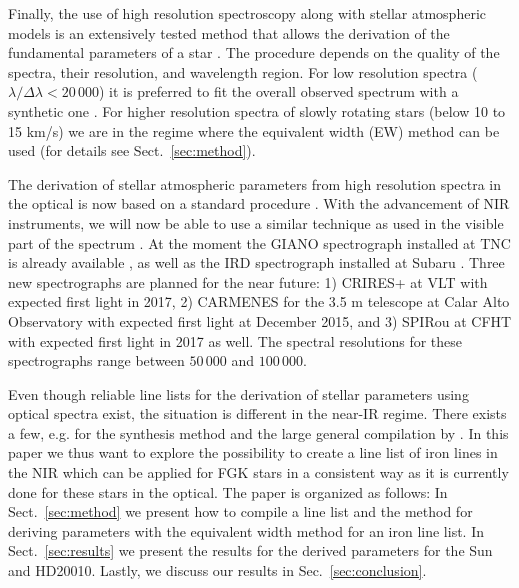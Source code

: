\documentclass{aa}
\begin{document}
Finally, the use of high resolution spectroscopy along with stellar
atmospheric models is an extensively tested method that allows
the derivation of the fundamental parameters of a star \citep[see
e.g.][]{Santos13}. The procedure depends on the quality of the spectra,
their resolution, and wavelength region. For low resolution spectra
($\lambda/\Delta\lambda < 20\,000$) it is preferred to fit the overall
observed spectrum with a synthetic one \citep[see e.g.][]{Recio2006}.
For higher resolution spectra of slowly rotating stars (below 10 to 15
\si{km/s}) we are in the regime where the equivalent width (EW) method
can be used (for details see Sect.~\ref{sec:method}).

The derivation of stellar atmospheric parameters from high
resolution spectra in the optical is now based on a standard
procedure \citep[see e.g.][]{Valenti2005,Sousa2008a}. With the
advancement of NIR instruments, we will now be able to use a similar
technique as used in the visible part of the spectrum \citep[see
e.g.][]{Melendez1999,Tsantaki2013,Sousa2008a,Bensby2014,Mucciarelli2013}
. At the moment the GIANO spectrograph installed at TNC is already
available \citep{GIANO}, as well as the IRD spectrograph installed at
Subaru \citep{IRD}. Three new spectrographs are planned for the near
future: 1) CRIRES+ at VLT \citep{CRIRESp} with expected first light in
2017, 2) CARMENES for the 3.5 m telescope at Calar Alto Observatory
\citep{CARMENES} with expected first light at December 2015, and 3)
SPIRou at CFHT \citep{SPIROU1,SPIROU2} with expected first light in 2017
as well. The spectral resolutions for these spectrographs range between
$50\,000$ and $100\,000$.

Even though reliable line lists for the derivation of stellar parameters
using optical spectra exist, the situation is different in the near-IR
regime. There exists a few, e.g. \citet{Onehag2012,Rhodin2015} for the
synthesis method and the large general compilation by \citet{Melendez1999}.
In this paper we thus want to explore the possibility to create
a line list of iron lines in the NIR which can be applied for FGK stars
in a consistent way as it is currently done for these stars in the
optical. The paper is organized as follows: In Sect.~\ref{sec:method}
we present how to compile a line list and the method for deriving parameters
with the equivalent width method for an iron line list. In
Sect.~\ref{sec:results} we present the results for the derived parameters
for the Sun and HD20010. Lastly, we discuss our results in Sec.~\ref{sec:conclusion}.
\end{document}
